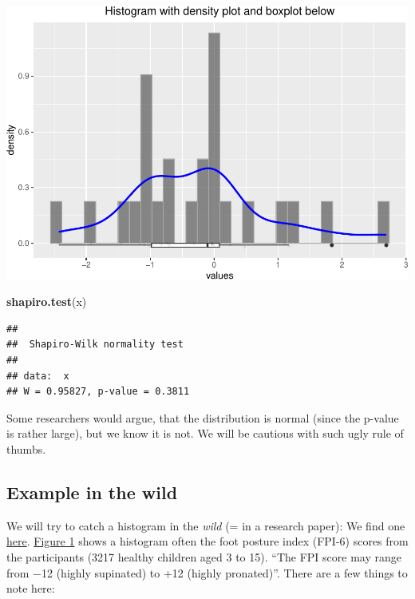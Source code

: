 \documentclass[
]{book}
\newenvironment{Shaded}{\begin{snugshade}}{\end{snugshade}}
\newcommand{\FunctionTok}[1]{\textcolor[rgb]{0.13,0.29,0.53}{\textbf{#1}}}
\newcommand{\NormalTok}[1]{#1}
\newcommand{\pandocbounded}[1]{#1}
\begin{document}
\pandocbounded{\includegraphics[keepaspectratio]{_main_files/figure-latex/unnamed-chunk-20-1.pdf}}

\begin{Shaded}
\begin{Highlighting}[]
\FunctionTok{shapiro.test}\NormalTok{(x)}
\end{Highlighting}
\end{Shaded}

\begin{verbatim}
## 
##  Shapiro-Wilk normality test
## 
## data:  x
## W = 0.95827, p-value = 0.3811
\end{verbatim}

Some researchers would argue, that the distribution is normal (since the p-value is rather large),
but we know it is not. We will be cautious with such ugly rule of thumbs.

\subsection{Example in the wild}\label{example-in-the-wild}

We will try to catch a histogram in the \emph{wild} (= in a research paper): We find one
\href{https://bmjopen.bmj.com/content/bmjopen/9/4/e023341.full.pdf}{here}.
\href{https://bmjopen.bmj.com/content/bmjopen/9/4/e023341/F1.large.jpg}{Figure 1} shows a histogram often
the foot posture index (FPI-6) scores from the participants (3217 healthy children aged 3 to 15).
``The FPI score may range from −12 (highly supinated) to +12 (highly pronated)''.
There are a few things to note here:
\end{document}

